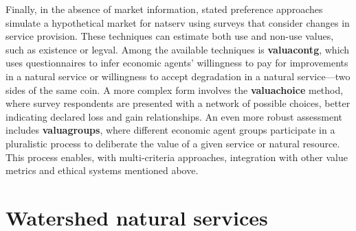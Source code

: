 \documentclass[./main_en.tex]{subfiles}
\begin{document}
\par Finally, in the absence of market information, stated preference approaches simulate a hypothetical market for \gls{natserv} using surveys that consider changes in service provision. These techniques can estimate both use and non-use values, such as existence or \gls{legval}. Among the available techniques is \textbf{\gls{valuacontg}}, which uses questionnaires to infer economic agents' willingness to pay for improvements in a natural service or willingness to accept degradation in a natural service—two sides of the same coin. A more complex form involves the \textbf{\gls{valuachoice}} method, where survey respondents are presented with a network of possible choices, better indicating declared loss and gain relationships. An even more robust assessment includes \textbf{\gls{valuagroups}}, where different economic agent groups participate in a pluralistic process to deliberate the value of a given service or natural resource. This process enables, with multi-criteria approaches, integration with other value metrics and ethical systems mentioned above.

\section{Watershed natural services} \label{chap:ecoeco:watersheds}
\end{document}
